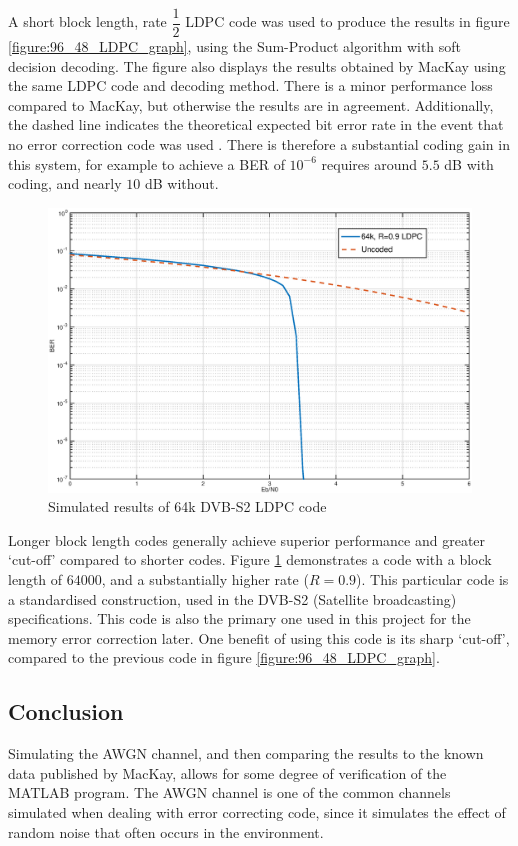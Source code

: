 \documentclass[11pt]{article}
\numberwithin{equation}{subsection}
\begin{document}
A short block length, rate $\dfrac{1}{2}$ LDPC code was used to produce the results in figure \ref{figure:96_48_LDPC_graph}, using the Sum-Product algorithm with soft decision decoding. The figure also displays the results obtained by MacKay using the same LDPC code and decoding method. There is a minor performance loss compared to MacKay, but otherwise the results are in agreement. Additionally, the dashed line indicates the {theoretical} expected bit error rate in the event that no error correction code was used \cite{coon15}. There is therefore a substantial coding gain in this system, for example to achieve a BER of $10^{-6}$ requires around $5.5$ dB with coding, and nearly $10$ dB without.

\begin{figure}[h]
\centering
\includegraphics[scale=0.6]{dvbs2_graph}
\caption{Simulated results of 64k DVB-S2 LDPC code}
\label{figure:64k_LDPC_graph}
\end{figure}

Longer block length codes generally achieve superior performance and greater `cut-off' compared to shorter codes. Figure \ref{figure:64k_LDPC_graph} demonstrates a code with a block length of $64000$, and a substantially higher rate ($R=0.9$). This particular code is a standardised construction, used in the DVB-S2 (Satellite broadcasting) specifications. This code is also the primary one used in this project for the memory error correction later. One benefit of using this code is its sharp `cut-off', compared to the previous code in figure \ref{figure:96_48_LDPC_graph}.

\subsection{Conclusion}
Simulating the AWGN channel, and then comparing the results to the known data published by MacKay, allows for some degree of verification of the MATLAB program. The AWGN channel is one of the common channels simulated when dealing with error correcting code, since it simulates the effect of random noise that often occurs in the environment. 
\end{document}
